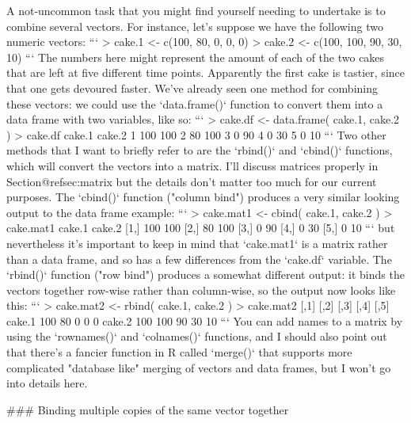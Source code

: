 A not-uncommon task that you might find yourself needing to undertake is to combine several vectors. For instance, let's suppose we have the following two numeric vectors:
```
> cake.1 <- c(100, 80, 0, 0, 0)
> cake.2 <- c(100, 100, 90, 30, 10)
```
The numbers here might represent the amount of each of the two cakes that are left at five different time points. Apparently the first cake is tastier, since that one gets devoured faster. We've already seen one method for combining these vectors: we could use the `data.frame()` function to convert them into a data frame with two variables, like so:
```
> cake.df <- data.frame( cake.1, cake.2 )
> cake.df
  cake.1 cake.2
1    100    100
2     80    100
3      0     90
4      0     30
5      0     10
```
Two other methods that I want to briefly refer to are the `rbind()` and `cbind()` functions, which will convert the vectors into a matrix. I'll discuss matrices properly in Section@refsec:matrix but the details don't matter too much for our current purposes. The `cbind()` function ("column bind") produces a very similar looking output to the data frame example:
```
> cake.mat1 <- cbind( cake.1, cake.2 )
> cake.mat1
     cake.1 cake.2
[1,]    100    100
[2,]     80    100
[3,]      0     90
[4,]      0     30
[5,]      0     10
```
but nevertheless it's important to keep in mind that `cake.mat1` is a matrix rather than a data frame, and so has a few differences from the `cake.df` variable. The `rbind()` function ("row bind") produces a somewhat different output: it binds the vectors together row-wise rather than column-wise, so the output now looks like this:
```
> cake.mat2 <- rbind( cake.1, cake.2 )
> cake.mat2
       [,1] [,2] [,3] [,4] [,5]
cake.1  100   80    0    0    0
cake.2  100  100   90   30   10
```
You can add names to a matrix by using the `rownames()` and `colnames()` functions, and I should also point out that there's a fancier function in R called `merge()` that supports more complicated "database like" merging of vectors and data frames, but I won't go into details here.

### Binding multiple copies of the same vector together

